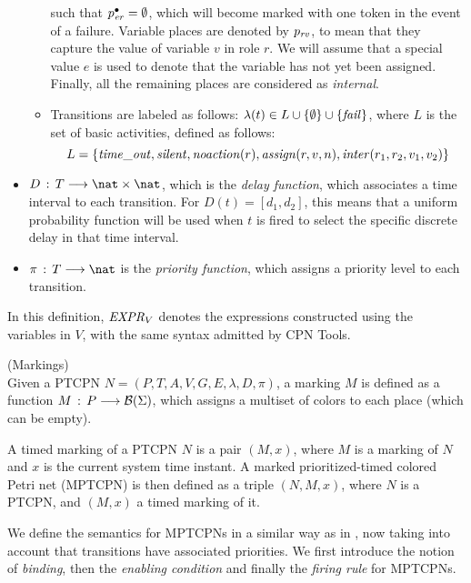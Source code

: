 \begin{itemize}
\begin{itemize}
such that $p^{\bullet}_{\it er}=\emptyset$, which will become marked
with one token in the event of a failure. Variable places
are denoted by $p_{\it rv}$, to mean that they capture the value
of variable $v$ in role $r$. We will assume that a special value $e$
is used to denote that the variable has not yet been 
assigned. Finally, all the remaining places are
considered as {\em internal}.
%
\item Transitions are labeled as follows: $\lambda(t)\in L
\cup \{ \emptyset \} \cup \{ {\it fail} \}$, where
$L$ is the set of basic activities, defined as follows:
%
\[
    L = \{ {\it time\_out}, 
           {\it silent}, {\it noaction}(r), {\it assign}(r,v,n),
           {\it inter}(r_1,r_2,v_1,v_2) \} 
\]
%
\end{itemize}
%
\item $D\,:\,T \longrightarrow \nat \times \nat$, which
is the {\em delay function}, which associates a time
interval to each transition. For $D(t)=[d_1,d_2]$,
this means that a uniform probability function will
be used when $t$ is fired to select the specific discrete
delay in that time interval.
%
\item $\pi\,:\,T \longrightarrow \nat$ is the
{\em priority function}, which assigns a priority level
to each transition. 
\end{itemize}

In this definition, ${\it EXPR}_V$ denotes the
expressions constructed using the variables in $V$,
with the same syntax admitted by CPN Tools.
\edfn 

\bdfn (Markings)\\
Given a PTCPN $N=(P,T,A,V,G,E,\lambda,D,\pi)$,
a marking $M$ is defined as a function
$M\,:\,P \longrightarrow {\cal B}(\Sigma)$,
which assigns a multiset of colors to each place
(which can be empty). 

A timed marking of a PTCPN $N$ is a pair $(M,x)$, where
$M$ is a marking of $N$ and $x$ is the current system time instant.
%
%
A marked prioritized-timed colored Petri net (MPTCPN)
is then defined as a triple $(N,M,x)$, where
$N$ is a PTCPN, and $(M,x)$ a timed marking of it.
%
\edfn

We define the semantics for MPTCPNs in a similar way as in \cite{CPN09}, 
now taking into account that transitions have associated priorities.
We first introduce the notion of {\em binding}, then
the {\em enabling condition} and finally the {\em firing rule}
for MPTCPNs.

